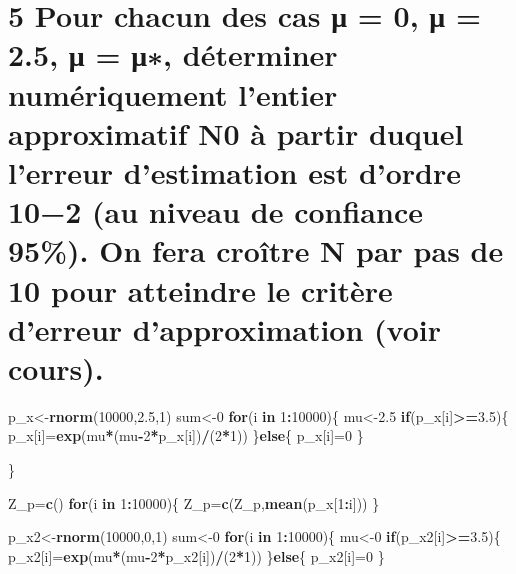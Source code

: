 \documentclass[]{article}
\newenvironment{Shaded}{\begin{snugshade}}{\end{snugshade}}
\newcommand{\KeywordTok}[1]{\textcolor[rgb]{0.13,0.29,0.53}{\textbf{#1}}}
\newcommand{\DecValTok}[1]{\textcolor[rgb]{0.00,0.00,0.81}{#1}}
\newcommand{\FloatTok}[1]{\textcolor[rgb]{0.00,0.00,0.81}{#1}}
\newcommand{\ControlFlowTok}[1]{\textcolor[rgb]{0.13,0.29,0.53}{\textbf{#1}}}
\newcommand{\OperatorTok}[1]{\textcolor[rgb]{0.81,0.36,0.00}{\textbf{#1}}}
\newcommand{\NormalTok}[1]{#1}
\begin{document}
\section{5 Pour chacun des cas μ = 0, μ = 2.5, μ = μ∗, déterminer
numériquement l'entier approximatif N0 à partir duquel l'erreur
d'estimation est d'ordre 10−2 (au niveau de confiance 95\%). On fera
croître N par pas de 10 pour atteindre le critère d'erreur
d'approximation (voir
cours).}\label{pour-chacun-des-cas--0--2.5---determiner-numeriquement-lentier-approximatif-n0-a-partir-duquel-lerreur-destimation-est-dordre-102-au-niveau-de-confiance-95.-on-fera-croitre-n-par-pas-de-10-pour-atteindre-le-critere-derreur-dapproximation-voir-cours.}

\begin{Shaded}
\begin{Highlighting}[]
\NormalTok{p_x<-}\KeywordTok{rnorm}\NormalTok{(}\DecValTok{10000}\NormalTok{,}\FloatTok{2.5}\NormalTok{,}\DecValTok{1}\NormalTok{)}
\NormalTok{sum<-}\DecValTok{0}
\ControlFlowTok{for}\NormalTok{(i }\ControlFlowTok{in} \DecValTok{1}\OperatorTok{:}\DecValTok{10000}\NormalTok{)\{}
\NormalTok{  mu<-}\FloatTok{2.5}
  \ControlFlowTok{if}\NormalTok{(p_x[i]}\OperatorTok{>=}\FloatTok{3.5}\NormalTok{)\{}
\NormalTok{  p_x[i]=}\KeywordTok{exp}\NormalTok{(mu}\OperatorTok{*}\NormalTok{(mu}\OperatorTok{-}\DecValTok{2}\OperatorTok{*}\NormalTok{p_x[i])}\OperatorTok{/}\NormalTok{(}\DecValTok{2}\OperatorTok{*}\DecValTok{1}\NormalTok{))}
\NormalTok{  \}}\ControlFlowTok{else}\NormalTok{\{}
\NormalTok{    p_x[i]=}\DecValTok{0}
\NormalTok{  \}}

\NormalTok{\}}

\NormalTok{Z_p=}\KeywordTok{c}\NormalTok{()}
\ControlFlowTok{for}\NormalTok{(i }\ControlFlowTok{in} \DecValTok{1}\OperatorTok{:}\DecValTok{10000}\NormalTok{)\{}
\NormalTok{  Z_p=}\KeywordTok{c}\NormalTok{(Z_p,}\KeywordTok{mean}\NormalTok{(p_x[}\DecValTok{1}\OperatorTok{:}\NormalTok{i]))}
\NormalTok{\}}


\NormalTok{p_x2<-}\KeywordTok{rnorm}\NormalTok{(}\DecValTok{10000}\NormalTok{,}\DecValTok{0}\NormalTok{,}\DecValTok{1}\NormalTok{)}
\NormalTok{sum<-}\DecValTok{0}
\ControlFlowTok{for}\NormalTok{(i }\ControlFlowTok{in} \DecValTok{1}\OperatorTok{:}\DecValTok{10000}\NormalTok{)\{}
\NormalTok{  mu<-}\DecValTok{0}
  \ControlFlowTok{if}\NormalTok{(p_x2[i]}\OperatorTok{>=}\FloatTok{3.5}\NormalTok{)\{}
\NormalTok{  p_x2[i]=}\KeywordTok{exp}\NormalTok{(mu}\OperatorTok{*}\NormalTok{(mu}\OperatorTok{-}\DecValTok{2}\OperatorTok{*}\NormalTok{p_x2[i])}\OperatorTok{/}\NormalTok{(}\DecValTok{2}\OperatorTok{*}\DecValTok{1}\NormalTok{))}
\NormalTok{  \}}\ControlFlowTok{else}\NormalTok{\{}
\NormalTok{    p_x2[i]=}\DecValTok{0}
\NormalTok{  \}}


\end{Highlighting}
\end{Shaded}
\end{document}
